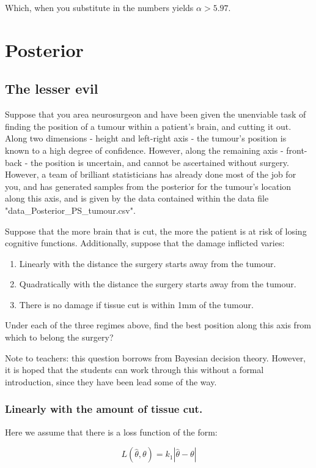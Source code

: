\documentclass[11pt,fullpage]{book}
\begin{document}
Which, when you substitute in the numbers yields $\alpha > 5.97$. 

\chapter{Posterior}
\section{The lesser evil}
Suppose that you area neurosurgeon and have been given the unenviable task of finding the position of a tumour within a patient's brain, and cutting it out. Along two dimensions - height and left-right axis - the tumour's position is known to a high degree of confidence. However, along the remaining axis - front-back - the position is uncertain, and cannot be ascertained without surgery. However, a team of brilliant statisticians has already done most of the job for you, and has generated samples from the posterior for the tumour's location along this axis, and is given by the data contained within the data file "data\_Posterior\_PS\_tumour.csv". 

Suppose that the more brain that is cut, the more the patient is at risk of losing cognitive functions. Additionally, suppose that the damage inflicted varies:

\begin{enumerate}
\item Linearly with the distance the surgery starts away from the tumour.
\item Quadratically with the distance the surgery starts away from the tumour.
\item There is no damage if tissue cut is within 1mm of the tumour.
\end{enumerate}

Under each of the three regimes above, find the best position along this axis from which to belong the surgery?

Note to teachers: this question borrows from Bayesian decision theory. However, it is hoped that the students can work through this without a formal introduction, since they have been lead some of the way.

\subsection{Linearly with the amount of tissue cut.}
Here we assume that there is a loss function of the form:

\begin{equation}
L(\hat{\theta},\theta) = k_1|\hat{\theta}-\theta|
\end{equation}
\end{document}
